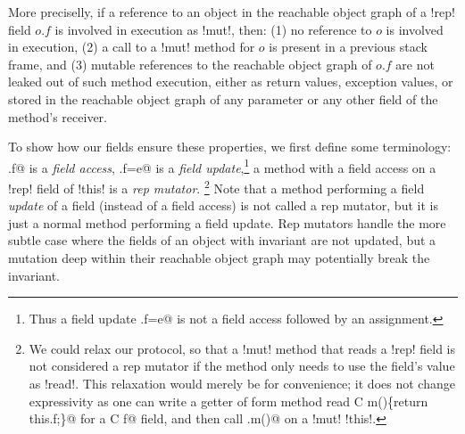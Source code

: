 More preciselly, if a reference to an object in the reachable object graph of a \Q!rep! field $o.f$ is involved in execution as \Q!mut!, then:
(1) no reference to $o$ is involved in execution,
(2) a call to a \Q!mut! method for $o$ is present in a previous stack frame, and
(3) mutable references to the reachable object graph of $o.f$ are not leaked out of such method execution, either as return values, exception values, or stored in the reachable object graph of any parameter or any other field of the method's receiver.


To show how our \Q@rep@ fields ensure these properties, we first define some terminology:
\Q@x.f@ is a \emph{field access}, \Q@x.f=e@ is a \emph {field update},\footnote{Thus a field update \Q@x.f=e@ is not a field access followed by an assignment.}
a \Q@mut@ method with a field access on a \Q!rep! field of \Q!this! is a \emph{rep mutator}.
\footnote{
We could relax our protocol,
so that a \Q!mut! method that reads a \Q!rep! field is not considered a rep mutator if the method only needs to use the field's value as \Q!read!.
This relaxation would merely be for convenience; it does not change expressivity as one can write a getter of form
\Q@read method read C m()\{return this.f;\}@
for a \Q@rep C f@ field,
and then call \Q@this.m()@ on a \Q!mut! \Q!this!.%
} 
Note that a method performing a field \emph{update} of a \Q@rep@ field (instead of a field access) is not called a rep mutator, but it is just a normal method performing a field update.
Rep mutators handle the more subtle case where the fields of an object with invariant are not updated, but a mutation deep within their reachable object graph may potentially break the invariant.

